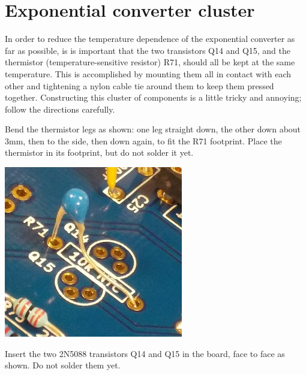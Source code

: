 \section{Exponential converter cluster}

In order to reduce the temperature dependence of the exponential converter
as far as possible, is is important that the two transistors Q14 and Q15,
and the thermistor (temperature-sensitive resistor) R71, should all be kept
at the same temperature.  This is accomplished by mounting them all in
contact with each other and tightening a nylon cable tie around them to keep
them pressed together.  Constructing this cluster of components is a little
tricky and annoying; follow the directions carefully.

Bend the thermistor legs as shown:  one leg straight down, the other down
about 3mm, then to the side, then down again, to fit the R71 footprint. 
Place the thermistor in its footprint, but do not solder it yet.

\nopagebreak
\noindent\includegraphics[width=\linewidth]{ntc-bend.jpg}

Insert the two 2N5088 transistors Q14 and Q15 in the board, face to face as
shown.  Do not solder them yet.

